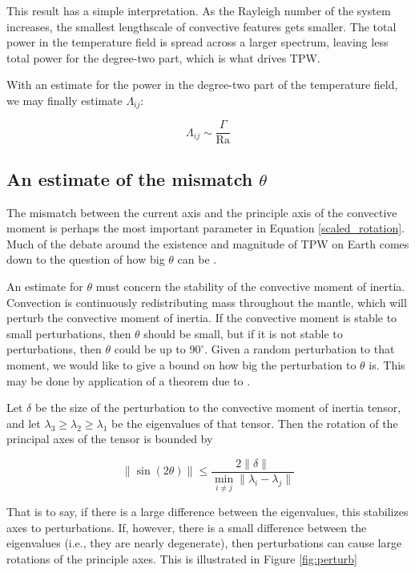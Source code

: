 \documentclass[extra,mreferee]{gji}
\begin{document}
This result has a simple interpretation.  As the Rayleigh number of the system increases, the smallest lengthscale of convective features gets smaller.  The total power in the temperature field is spread across a larger spectrum, leaving less total power for the degree-two part, which is what drives TPW.

With an estimate for the power in the degree-two part of the temperature field, we may finally estimate $\Lambda_{ij}$:

\begin{equation}
\Lambda_{ij} \sim \frac{\Gamma}{\mathrm{Ra} }
\end{equation}


\subsection{An estimate of the mismatch $\theta$}

The mismatch between the current axis and the principle axis of the convective moment is perhaps the most important parameter in Equation \ref{scaled_rotation}.  
Much of the debate around the existence and magnitude of TPW on Earth comes down to the question of how big $\theta$ can be \citep{kirschvink1997evidence, steinberger1997changes}.

An estimate for $\theta$ must concern the stability of the convective moment of inertia. 
Convection is continuously redistributing mass throughout the mantle, which will perturb the convective moment of inertia.  
If the convective moment is stable to small perturbations, then $\theta$ should be small, but if it is not stable to perturbations, then $\theta$ could be up to $90^\circ$. 
Given a random perturbation to that moment, we would like to give a bound on how big the perturbation to $\theta$ is. 
This may be done by application of a theorem due to \citet{davis1970rotation}.

Let $\delta$ be the size of the perturbation to the convective moment of inertia tensor, and let $\lambda_3 \ge \lambda_2 \ge \lambda_1$ be the eigenvalues of that tensor.  
Then the rotation of the principal axes of the tensor is bounded by

\begin{equation}
\lVert \sin(2 \theta) \rVert \le \frac{ 2 \lVert \delta \rVert}{ \displaystyle \min_{i \neq j} \lVert \lambda_i - \lambda_j \rVert }
\label{eq:kahan}
\end{equation} 

That is to say, if there is a large difference between the eigenvalues, this stabilizes axes to perturbations.  
If, however, there is a small difference between the eigenvalues (i.e., they are nearly degenerate), then perturbations can cause large rotations of the principle axes.
This is illustrated in Figure \ref{fig:perturb}
\end{document}

